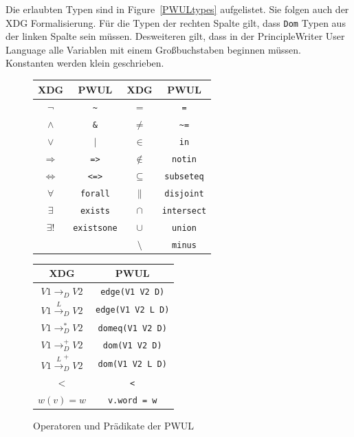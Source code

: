 Die erlaubten Typen sind in Figure~\ref{PWULtypes} aufgelistet. Sie
folgen auch der XDG Formalisierung. F\"ur die Typen der rechten Spalte
gilt, dass {\tt Dom} Typen aus der linken Spalte sein m\"ussen.
Desweiteren gilt, dass in der PrincipleWriter User Language alle
Variablen mit einem Gro{\ss}buchstaben beginnen m\"ussen. Konstanten
werden klein geschrieben.

\begin{figure}
\centering
\begin{tabular}{| c | c || c | c |}
\hline
{\bf XDG} & {\bf PWUL} & {\bf XDG} & {\bf PWUL}\\
\hline
$\neg$ & {\tt \verb=~=} & $=$ & {\tt =} \\
$\wedge$ & {\tt \&} & $\neq$ & {\tt \verb=~==} \\
$\vee$ & {\tt $|$} & $\in$ & {\tt in} \\
$\Rightarrow$ & {\tt =>} & $\notin$ & {\tt notin}\\
$\Leftrightarrow$ & {\tt <=>} & $\subseteq$ & {\tt subseteq} \\
$\forall$ & {\tt forall} & $\|$ & {\tt disjoint}\\
$\exists$ & {\tt exists} & $\cap$ & {\tt intersect}\\
$\exists!$ & {\tt existsone} & $\cup$ & {\tt union}\\
 & & $\setminus$ & {\tt minus} \\
\hline
\end{tabular}

\vspace{0.5cm}
\begin{tabular}{| c | c |}
\hline
{\bf XDG} & {\bf PWUL}\\
\hline
$V1 \rightarrow_D V2$  & {\tt edge(V1 V2 D)} \\
$V1 \overset{L}{\rightarrow}_D V2$ & {\tt edge(V1 V2 L D)}\\
$V1 \rightarrow_D^* V2$  & {\tt domeq(V1 V2 D)} \\
$V1 \rightarrow_D^+ V2$  & {\tt dom(V1 V2 D)} \\
$V1 \overset{L}{\rightarrow}_D^+ V2$ & {\tt dom(V1 V2 L D)}\\
$<$ & {\tt <}\\
$w(v) = w $ & {\tt v.word = w}\\
\hline
\end{tabular}
\caption{Operatoren und Pr\"adikate der PWUL}
\label{PWULwords}
\end{figure}

